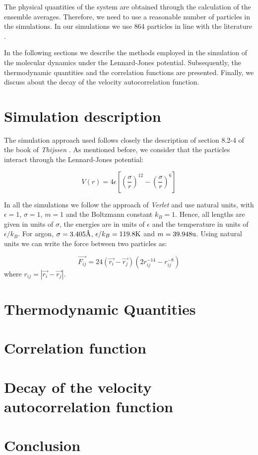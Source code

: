 \documentclass[aps,prl,reprint,groupedaddress]{revtex4-1}
\begin{document}
The physical quantities of the system are obtained through the calculation of the ensemble averages. Therefore, we need to use a reasonable number of particles in the simulations. In our simulations we use 864 particles in line with the literature \cite{Verlet1967, Rahman1964}.

In the following sections we describe the methods employed in the simulation of the molecular dynamics under the Lennard-Jones potential. Subsequently, the thermodynamic quantities and the correlation functions are presented. Finally, we discuss about the decay of the velocity autocorrelation function.

\section{Simulation description \label{description}}

The simulation approach used follows closely the description of section 8.2-4 of the book of \textit{Thijssen} \cite{ICCPBook}. As mentioned before, we consider that the particles interact through the Lennard-Jones potential:

\begin{equation}
	V(r) = 4 \epsilon \left[\left(\frac{\sigma}{r} \right)^{12} - \left(\frac{\sigma}{r} \right)^{6} \right]
\end{equation}

In all the simulations we follow the approach of \textit{Verlet} \cite{Verlet1967} and use natural units, with $\epsilon = 1$, $\sigma = 1$, $m = 1$ and the Boltzmann constant $k_B = 1$. Hence, all lengths are given in units of $\sigma$, the energies are in units of $\epsilon$ and the temperature in units of $\epsilon/k_B$. For argon, $\sigma = 3.405 \textup{\AA}$, $\epsilon/k_B = 119.8 \textup{K}$ \cite{Argon} and $m = 39.948 \textup{u}$. Using natural units we can write the force between two particles as:

\begin{equation}
	\vec{F_{ij}} = 24 \left( \vec{r_i} - \vec{r_j} \right) \left(2r_{ij}^{-14} - r_{ij}^{-8} \right)
\end{equation}
where $r_{ij} = |\vec{r_i} - \vec{r_j}|$.



\section{Thermodynamic Quantities \label{thermo}}

\section{Correlation function \label{correlation}}

\section{Decay of the velocity autocorrelation function \label{decay}}

\section{Conclusion \label{conclusion}}



\end{document}
